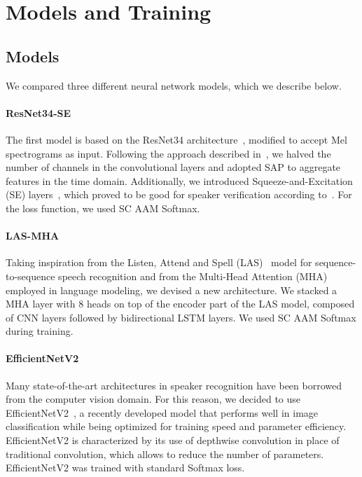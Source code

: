 \documentclass[conference]{IEEEtran}
\begin{document}
\section{Models and Training}

\subsection{Models}

We compared three different neural network models, which we describe below.

\paragraph{ResNet34-SE}

The first model is based on the ResNet34 architecture~\cite{he2016resnet}, modified to accept Mel spectrograms as input. Following the approach described in~\cite{heo2020clova,chung2020defence}, we halved the number of channels in the convolutional layers and adopted SAP to aggregate features in the time domain. Additionally, we introduced Squeeze-and-Excitation (SE) layers~\cite{jie2020squeeze}, which proved to be good for speaker verification according to~\cite{zhang2021beijing}. For the loss function, we used SC AAM Softmax.

\paragraph{LAS-MHA}

Taking inspiration from the Listen, Attend and Spell (LAS)~\cite{irie2019las} model for sequence-to-sequence speech recognition and from the Multi-Head Attention (MHA)~\cite{vaswani2017attention} employed in language modeling, we devised a new architecture. We stacked a MHA layer with 8 heads on top of the encoder part of the LAS model, composed of CNN layers followed by bidirectional LSTM layers. We used SC AAM Softmax during training.

\paragraph{EfficientNetV2}

Many state-of-the-art architectures in speaker recognition have been borrowed from the computer vision domain. For this reason, we decided to use EfficientNetV2~\cite{tan2021efficientnetv2}, a recently developed model that performs well in image classification while being optimized for training speed and parameter efficiency. EfficientNetV2 is characterized by its use of depthwise convolution in place of traditional convolution, which allows to reduce the number of parameters. EfficientNetV2 was trained with standard Softmax loss.
\end{document}
